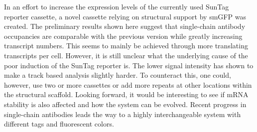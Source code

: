 In an effort to increase the expression levels of the currently used SunTag reporter cassette, a novel cassette relying on structural support by smGFP was created.
The preliminary results shown here suggest that single-chain antibody occupancies are comparable with the previous version while greatly increasing transcript numbers.
This seems to mainly be achieved through more translating transcripts per cell.
However, it is still unclear what the underlying cause of the poor induction of the SunTag reporter is.
The lower signal intensity has shown to make a track based analysis slightly harder.
To counteract this, one could, however, use two or more cassettes or add more repeats at other locations within the structural scaffold.
Looking forward, it would be interesting to see if mRNA stability is also affected and how the system can be evolved.
Recent progress in single-chain antibodies leads the way to a highly interchangeable system with different tags and fluorescent colors.
